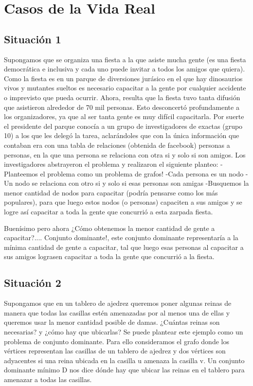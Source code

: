 \section{Casos de la Vida Real}

\subsection{Situación 1}
Supongamos que se organiza una fiesta a la que asiste mucha gente (es una fiesta democrática e inclusiva y cada uno puede invitar a todos los amigos que quiera). Como la fiesta es en un parque de diversiones jurásico en el que hay dinosaurios vivos y mutantes sueltos es necesario capacitar a la gente por cualquier accidente o imprevisto que pueda ocurrir. Ahora, resulta que la fiesta tuvo tanta difusión que asistieron alrededor de 70 mil personas. Esto desconcertó profundamente a los organizadores, ya que al ser tanta gente es muy difícil capacitarla. Por suerte el presidente del parque conocía a un grupo de investigadores de exactas (grupo 10) a los que les delegó la tarea, aclarándoles que con la única información que contaban era con una tabla de relaciones (obtenida de facebook) personas a personas, en la que una persona se relaciona con otra si y solo si son amigos.
Los investigadores abstrayeron el problema y realizaron el siguiente planteo:
-Planteemos el problema como un problema de grafos!
-Cada persona es un nodo
-Un nodo se relaciona con otro si y solo si esas personas son amigas
-Busquemos la menor cantidad de nodos para capacitar (podría pensarse como los más populares), para que luego estos nodos (o personas) capaciten a sus amigos y se logre así capacitar a toda la gente que concurrió a esta zarpada fiesta.

Buenísimo pero ahora ¿Cómo obtenemos la menor cantidad de gente a capacitar?.... Conjunto dominante!, este conjunto dominante representaría a la mínima cantidad de gente a capacitar, tal que luego esas personas al capacitar a sus amigos lograsen capacitar a toda la gente que concurrió a la fiesta.

\subsection{Situación 2}
Supongamos que en un tablero de ajedrez queremos poner algunas reinas de manera que todas las casillas estén amenazadas por al menos una de ellas y queremos usar la menor cantidad posible de damas. ¿Cuántas reinas son necesarias? y ¿cómo hay que ubicarlas? Se puede plantear este ejemplo como un problema de conjunto dominante. Para ello
consideramos el grafo donde los vértices representan las casillas de un tablero de ajedrez y dos vértices son adyacentes si una reina ubicada en la casilla u amenaza la casilla v. Un conjunto dominante mínimo D nos dice dónde hay que ubicar las reinas en el tablero para amenazar a todas las casillas. 

